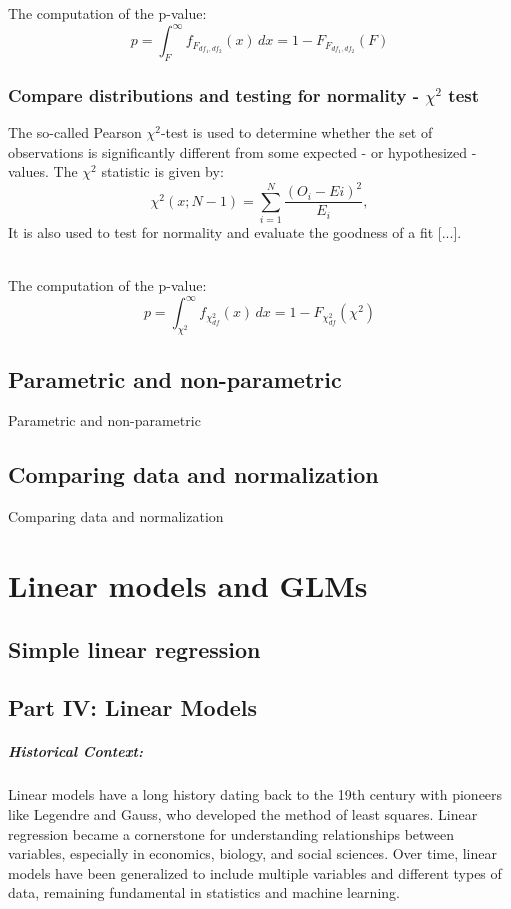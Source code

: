 \documentclass{book}
\begin{document}
The computation of the p-value:
\[
p = \int_{F}^{\infty} f_{F_{df_1, df_2}}(x)\,dx = 1 - F_{F_{df_1, df_2}}(F)
\]


\newpage

\subsection{Compare distributions and testing for normality - $\chi^{2}$ test}

The so-called Pearson $\chi^{2}$-test is used to determine whether the set of observations is significantly different from some expected - or hypothesized - values. The $\chi^{2}$ statistic is given by:
\[
    \chi^{2}(x; N - 1) = \sum_{i = 1}^{N}\frac{(O_{i} - E{i})^{2}}{E_i},
\]
It is also used to test for normality and evaluate the goodness of a fit [...].\\\

The computation of the p-value:
\[
p = \int_{\chi^2}^{\infty} f_{\chi^2_{df}}(x)\,dx = 1 - F_{\chi^2_{df}}(\chi^2)
\]

\newpage

\section{Parametric and non-parametric}

Parametric and non-parametric

\newpage

\section{Comparing data and normalization}
Comparing data and normalization



\chapter{Linear models and GLMs}

\section{Simple linear regression}
\section*{Part IV: Linear Models}

\paragraph{Historical Context:}
Linear models have a long history dating back to the 19th century with pioneers like Legendre and Gauss, who developed the method of least squares. Linear regression became a cornerstone for understanding relationships between variables, especially in economics, biology, and social sciences. Over time, linear models have been generalized to include multiple variables and different types of data, remaining fundamental in statistics and machine learning.
\end{document}
